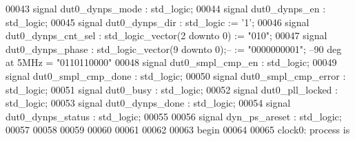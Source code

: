 \begin{DoxyCode}
00043    \textcolor{keywordflow}{signal} \textcolor{vhdlchar}{dut0_dynps_mode}        \textcolor{vhdlchar}{:} \textcolor{comment}{std\_logic};
00044    \textcolor{keywordflow}{signal} \textcolor{vhdlchar}{dut0_dynps_en}          \textcolor{vhdlchar}{:} \textcolor{comment}{std\_logic};
00045    \textcolor{keywordflow}{signal} \textcolor{vhdlchar}{dut0_dynps_dir}         \textcolor{vhdlchar}{:} \textcolor{comment}{std\_logic} \textcolor{vhdlchar}{:=} \textcolor{vhdlchar}{'}\textcolor{vhdllogic}{}\textcolor{vhdllogic}{1}\textcolor{vhdlchar}{'};
00046    \textcolor{keywordflow}{signal} \textcolor{vhdlchar}{dut0_dynps_cnt_sel}     \textcolor{vhdlchar}{:} \textcolor{comment}{std\_logic\_vector}\textcolor{vhdlchar}{(}\textcolor{vhdllogic}{}\textcolor{vhdllogic}{2} \textcolor{keywordflow}{downto} \textcolor{vhdllogic}{}\textcolor{vhdllogic}{0}\textcolor{vhdlchar}{)} \textcolor{vhdlchar}{:=} \textcolor{vhdllogic}{"010"};
00047    \textcolor{keywordflow}{signal} \textcolor{vhdlchar}{dut0_dynps_phase}       \textcolor{vhdlchar}{:} \textcolor{comment}{std\_logic\_vector}\textcolor{vhdlchar}{(}\textcolor{vhdllogic}{}\textcolor{vhdllogic}{9} \textcolor{keywordflow}{downto} \textcolor{vhdllogic}{}\textcolor{vhdllogic}{0}\textcolor{vhdlchar}{)};\textcolor{keyword}{-- := "0000000001"; --90 deg at 5MHz =
       "0110110000"}
00048    \textcolor{keywordflow}{signal} \textcolor{vhdlchar}{dut0_smpl_cmp_en}       \textcolor{vhdlchar}{:} \textcolor{comment}{std\_logic};
00049    \textcolor{keywordflow}{signal} \textcolor{vhdlchar}{dut0_smpl_cmp_done}     \textcolor{vhdlchar}{:} \textcolor{comment}{std\_logic};
00050    \textcolor{keywordflow}{signal} \textcolor{vhdlchar}{dut0_smpl_cmp_error}    \textcolor{vhdlchar}{:} \textcolor{comment}{std\_logic};
00051    \textcolor{keywordflow}{signal} \textcolor{vhdlchar}{dut0_busy}              \textcolor{vhdlchar}{:} \textcolor{comment}{std\_logic};
00052    \textcolor{keywordflow}{signal} \textcolor{vhdlchar}{dut0_pll_locked}        \textcolor{vhdlchar}{:} \textcolor{comment}{std\_logic};
00053    \textcolor{keywordflow}{signal} \textcolor{vhdlchar}{dut0_dynps_done}        \textcolor{vhdlchar}{:} \textcolor{comment}{std\_logic};
00054    \textcolor{keywordflow}{signal} \textcolor{vhdlchar}{dut0_dynps_status}      \textcolor{vhdlchar}{:} \textcolor{comment}{std\_logic};
00055    
00056    \textcolor{keywordflow}{signal} \textcolor{vhdlchar}{dyn_ps_areset}          \textcolor{vhdlchar}{:} \textcolor{comment}{std\_logic};
00057    
00058    
00059    
00060    
00061    
00062   
00063 \textcolor{vhdlkeyword}{begin }
00064   
00065       clock0: \textcolor{keywordflow}{process} \textcolor{keywordflow}{is}

\end{DoxyCode}
